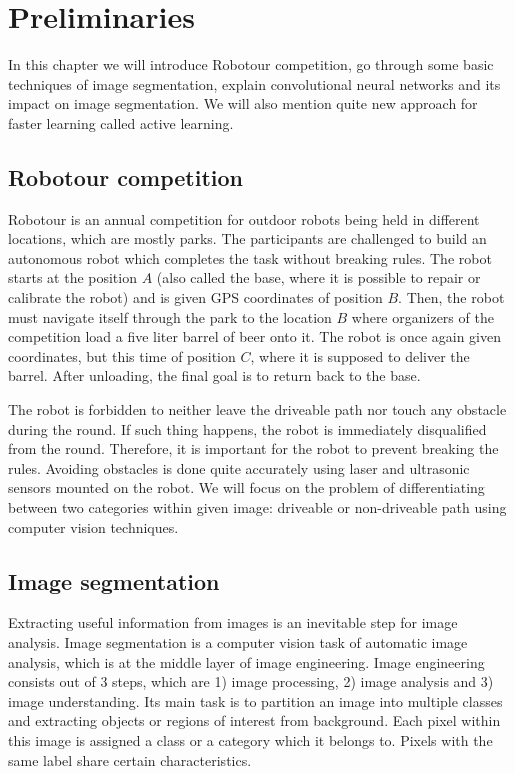 \chapter{Preliminaries}
\label{chapter:preliminaries}

In this chapter we will introduce Robotour competition,
go through some basic techniques of image segmentation,
explain convolutional neural networks and its impact on image segmentation. We will
also mention quite new approach for faster learning called active learning.

\section{Robotour competition}
\label{sec:robotour}

Robotour is an annual competition for outdoor robots being held in different locations,
which are mostly parks.
The participants are challenged to build an autonomous robot which completes the task
without breaking rules. The robot starts at the position $A$
(also called the base, where it is possible to repair or calibrate the robot) and
is given GPS coordinates of position $B$. Then, the robot must navigate itself through
the park to the location $B$ where organizers of the competition load a five liter
barrel of beer onto it. The robot is once again given coordinates, but this time
of position $C$,
where it is supposed to deliver the barrel. After unloading, the final goal is to return
back to the base.

The robot is forbidden to neither leave the driveable path nor touch any obstacle during
the round. If such thing happens, the robot is immediately disqualified from the round.
Therefore, it is important for the robot to prevent breaking the rules. Avoiding
obstacles is done quite accurately using laser and ultrasonic sensors mounted on the
robot. We will focus on the problem of differentiating between two categories within
given image: driveable or non-driveable path using computer vision techniques.

\section{Image segmentation}
\label{sec:image_segmentation}

Extracting useful information from images is an inevitable step for image analysis.
Image segmentation is a computer vision task of automatic image analysis, which
is at the middle layer of image engineering. Image engineering consists out of 3 steps,
which are 1) image processing, 2) image analysis and 3) image understanding.
Its main task is to partition an image into multiple
classes and extracting objects or regions of interest from background.
Each pixel within this image is assigned a class or a category which
it belongs to. Pixels with the same label share certain characteristics.
\cite{zhang2009image}

